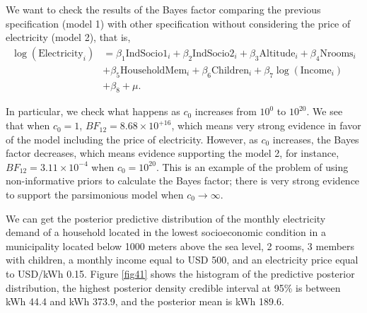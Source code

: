 We want to check the results of the Bayes factor comparing the previous specification (model 1) with other specification without considering the price of electricity (model 2), that is,
\begin{align*}
	\log(\text{Electricity}_i) & = \beta_1\text{IndSocio1}_i + \beta_2\text{IndSocio2}_i + \beta_3\text{Altitude}_i + \beta_4\text{Nrooms}_i\\
	& + \beta_5\text{HouseholdMem}_i + \beta_6\text{Children}_i + \beta_7\log(\text{Income}_i)\\
	& + \beta_8 + \mu.
\end{align*}

In particular, we check what happens as $c_0$ increases from $10^{0}$ to $10^{20}$. We see that when $c_0=1$, $BF_{12}=8.68\times 10^{+16}$, which means very strong evidence in favor of the model including the price of electricity. However, as $c_0$ increases, the Bayes factor decreases, which means evidence supporting the model 2, for instance, $BF_{12}=3.11\times 10^{-4}$ when $c_0=10^{20}$. This is an example of the problem of using non-informative priors to calculate the Bayes factor; there is very strong evidence to support the parsimonious model when $c_0\rightarrow \infty$.

We can get the posterior predictive distribution of the monthly electricity demand of a household located in the lowest socioeconomic condition in a municipality located below 1000 meters above the sea level, 2 rooms, 3 members with children, a monthly income equal to USD 500, and an electricity price equal to USD/kWh 0.15. Figure \ref{fig41} shows the histogram of the predictive posterior distribution, the highest posterior density credible interval at 95\% is between kWh 44.4 and kWh 373.9, and the posterior mean is kWh 189.6.      

